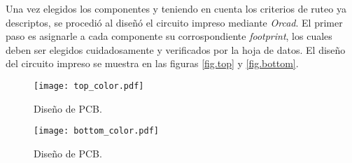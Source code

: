 Una vez elegidos los componentes y teniendo en cuenta los criterios de ruteo ya descriptos, se procedió al diseñó el circuito impreso mediante \textit{Orcad}. El primer paso es asignarle a cada componente su corrospondiente \textit{footprint}, los cuales deben ser elegidos cuidadosamente y verificados por la hoja de datos. El diseño del circuito impreso se muestra en las figuras \ref{fig.top} y \ref{fig.bottom}. 

\begin{figure}[H]
	\centering
	\texttt{[image: top\_color.pdf]}
	\caption{Diseño de PCB.}
	\label{fig.pcb_top}
\end{figure}

\begin{figure}[H]
	\centering
	\texttt{[image: bottom\_color.pdf]}
	\caption{Diseño de PCB.}
	\label{fig.pcb_bottom}
\end{figure}

